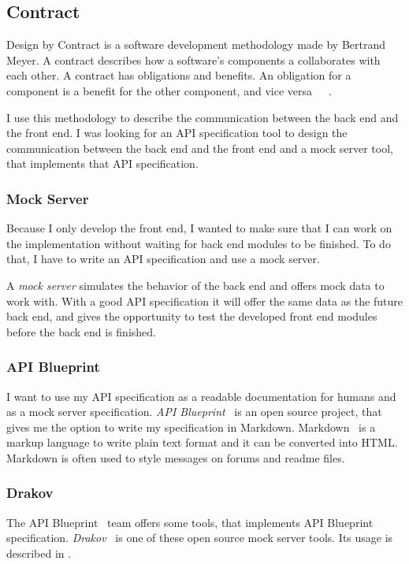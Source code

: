 \subsection{Contract}
Design by Contract is a software development methodology made by Bertrand Meyer. A contract describes how a software's components a collaborates with each other. A contract has obligations and benefits. An obligation for a component is a benefit for the other component, and vice versa~\cite{touch-of-class}~\cite{Szepes-onlab}~\cite{szofttech}.

I use this methodology to describe the communication between the back end and the front end. I was looking for an API specification tool to design the communication between the back end and the front end and a mock server tool, that implements that API specification.

\subsubsection{Mock Server}
Because I only develop the front end, I wanted to make sure that I can work on the implementation without waiting for back end modules to be finished. To do that, I have to write an API specification and use a mock server. 

A \emph{mock server} simulates the behavior of the back end and offers mock data to work with. With a good API specification it will offer the same data as the future back end, and gives the opportunity to test the developed front end modules before the back end is finished.

\subsubsection{API Blueprint}
\label{api-blueprint}

I want to use my API specification as a readable documentation for humans and as a mock server specification. \emph{API Blueprint}~\cite{api-blueprint} is an open source project, that gives me the option to write my specification in Markdown. Markdown~\cite{markdown} is a markup language to write plain text format and it can be converted into HTML. Markdown is often used to style messages on forums and readme files. 

\subsubsection{Drakov}

The API Blueprint~\cite{api-blueprint} team offers some tools, that implements API Blueprint specification. \emph{Drakov}~\cite{drakov} is one of these open source mock server tools. Its usage is described in .

